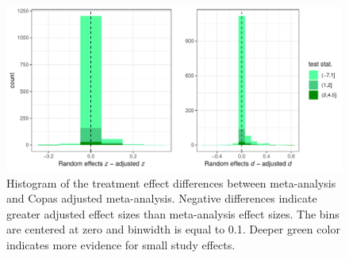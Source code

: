 \documentclass[11pt,a4paper,twoside]{book}\usepackage[]{graphicx}\usepackage[]{color}
\newenvironment{knitrout}{}{} %
\begin{document}
\begin{figure}
\begin{knitrout}
\color{fgcolor}

{\centering \includegraphics[width=\textwidth-3cm]{figure/ch03_figunnamed-chunk-21-1} 

}



\end{knitrout}
\caption{Histogram of the treatment effect differences between meta-analysis and Copas adjusted meta-analysis. Negative differences indicate greater adjusted effect sizes than meta-analysis effect sizes. The bins are centered at zero and binwidth is equal to 0.1. Deeper green color indicates more evidence for small study effects.}
\label{fig:adjustment.copas}
\end{figure}
\end{document}
